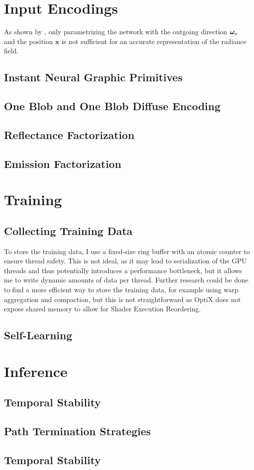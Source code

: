 \section{Input Encodings}

As shown by \textcite{ren2013}, only parametrizing the network with the outgoing direction $\bm{\omega}_o$ and the position $\mathbf{x}$ is not sufficient for an accurate representation of the radiance field.

\subsection{Instant Neural Graphic Primitives}

\subsection{One Blob and One Blob Diffuse Encoding}

\subsection{Reflectance Factorization}

\subsection{Emission Factorization}

\section{Training}

\subsection{Collecting Training Data}

To store the training data, I use a fixed-size ring buffer with an atomic counter to ensure thread safety.
This is not ideal, as it may lead to serialization of the GPU threads and thus potentially introduces a performance bottleneck, but it allows me to write dynamic amounts of data per thread.
Further research could be done to find a more efficient way to store the training data, for example using warp aggregation and compaction, but this is not straightforward as OptiX does not expose shared memory to allow for Shader Execution Reordering.

\subsection{Self-Learning}

\section{Inference}

\subsection{Temporal Stability}

\subsection{Path Termination Strategies}

\subsection{Temporal Stability}

